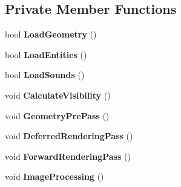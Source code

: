 \subsection*{Private Member Functions}
\begin{DoxyCompactItemize}
\item 
bool {\bfseries Load\+Geometry} ()\hypertarget{class_scene_aa5d6aed57a5640c318188b18f51f2d80}{}\label{class_scene_aa5d6aed57a5640c318188b18f51f2d80}

\item 
bool {\bfseries Load\+Entities} ()\hypertarget{class_scene_a1a8f3fe26766d0af1a3e823857266426}{}\label{class_scene_a1a8f3fe26766d0af1a3e823857266426}

\item 
bool {\bfseries Load\+Sounds} ()\hypertarget{class_scene_abc8ddcccced32a208d4d4b1968823833}{}\label{class_scene_abc8ddcccced32a208d4d4b1968823833}

\item 
void {\bfseries Calculate\+Visibility} ()\hypertarget{class_scene_a6d84a4166268d75e48fb5376b2e2554d}{}\label{class_scene_a6d84a4166268d75e48fb5376b2e2554d}

\item 
void {\bfseries Geometry\+Pre\+Pass} ()\hypertarget{class_scene_aadff4239f183b2edaeecff9480e672a5}{}\label{class_scene_aadff4239f183b2edaeecff9480e672a5}

\item 
void {\bfseries Deferred\+Rendering\+Pass} ()\hypertarget{class_scene_a53f61c29a484b806b28b01cb90ac38c4}{}\label{class_scene_a53f61c29a484b806b28b01cb90ac38c4}

\item 
void {\bfseries Forward\+Rendering\+Pass} ()\hypertarget{class_scene_a6151031a230527dfd4146317b92bad1b}{}\label{class_scene_a6151031a230527dfd4146317b92bad1b}

\item 
void {\bfseries Image\+Processing} ()\hypertarget{class_scene_aeeb0c33283db0dda53e14d66cf33f701}{}\label{class_scene_aeeb0c33283db0dda53e14d66cf33f701}

\end{DoxyCompactItemize}
